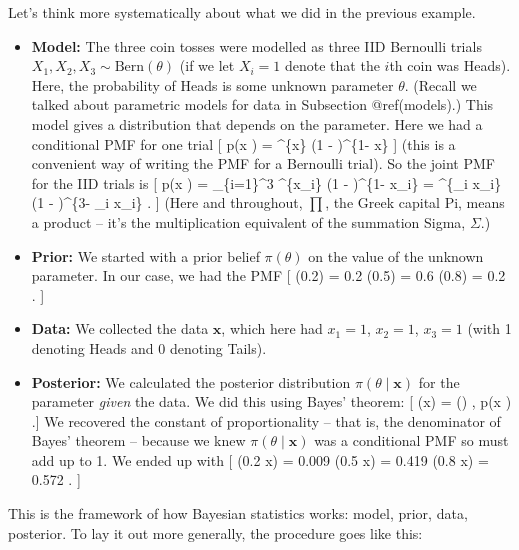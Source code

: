 \documentclass[
  letterpaper,
]{report}
\providecommand{\tightlist}{%
  \setlength{\itemsep}{0pt}\setlength{\parskip}{0pt}}\usepackage{longtable,booktabs,array}
\theoremstyle{definition}
\theoremstyle{definition}
\theoremstyle{remark}
\begin{document}
Let's think more systematically about what we did in the previous
example.

\begin{itemize}
\tightlist
\item
  \textbf{Model:} The three coin tosses were modelled as three IID
  Bernoulli trials \(X_1, X_2, X_3 \sim \text{Bern}(\theta)\) (if we let
  \(X_i = 1\) denote that the \(i\)th coin was Heads). Here, the
  probability of Heads is some unknown parameter \(\theta\). (Recall we
  talked about parametric models for data in Subsection @ref(models).)
  This model gives a distribution that depends on the parameter. Here we
  had a conditional PMF for one trial {[} p(x \mid \theta) =
  \theta\^{}\{x\} (1 - \theta)\^{}\{1- x\} {]} (this is a convenient way
  of writing the PMF for a Bernoulli trial). So the joint PMF for the
  IID trials is {[} p(\mathbf x \mid \theta) = \prod\_\{i=1\}\^{}3
  \theta\^{}\{x\_i\} (1 - \theta)\^{}\{1- x\_i\} = \theta\^{}\{\sum\_i
  x\_i\} (1 - \theta)\^{}\{3- \sum\_i x\_i\} . {]} (Here and throughout,
  \(\prod\), the Greek capital Pi, means a product -- it's the
  multiplication equivalent of the summation Sigma, \(\Sigma\).)
\item
  \textbf{Prior:} We started with a prior belief \(\pi(\theta)\) on the
  value of the unknown parameter. In our case, we had the PMF {[}
  \pi(0.2) = 0.2 \qquad \pi(0.5) = 0.6 \qquad \pi(0.8) = 0.2 . {]}
\item
  \textbf{Data:} We collected the data \(\mathbf x\), which here had
  \(x_1 = 1\), \(x_2 = 1\), \(x_3 = 1\) (with 1 denoting Heads and 0
  denoting Tails).
\item
  \textbf{Posterior:} We calculated the posterior distribution
  \(\pi(\theta \mid \mathbf x)\) for the parameter \emph{given} the
  data. We did this using Bayes' theorem: {[} \pi(\theta \mid \mathbf x)
  = 
  \propto \pi(\theta) , p(\mathbf x \mid \theta) .{]} We recovered the
  constant of proportionality -- that is, the denominator of Bayes'
  theorem -- because we knew \(\pi(\theta \mid \mathbf x)\) was a
  conditional PMF so must add up to 1. We ended up with {[} \pi(0.2
  \mid \mathbf x) = 0.009 \qquad \pi(0.5 \mid \mathbf x) = 0.419
  \qquad \pi(0.8 \mid \mathbf x) = 0.572 . {]}
\end{itemize}

This is the framework of how Bayesian statistics works: model, prior,
data, posterior. To lay it out more generally, the procedure goes like
this:
\end{document}
